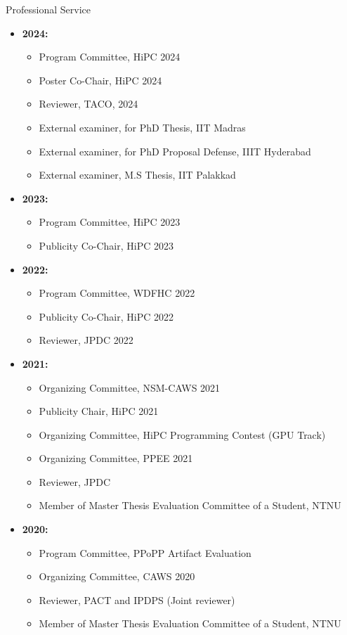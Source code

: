 \documentclass{resume} %
\begin{document}
\begin{rSection}{Professional Service}
\begin{itemize}
	\item \textbf{2024:}
	\begin{itemize}	
		\item Program Committee, HiPC 2024
		\item Poster Co-Chair, HiPC 2024
		\item Reviewer, TACO, 2024
		\item External examiner, for PhD Thesis, IIT Madras
		\item External examiner, for PhD Proposal Defense, IIIT Hyderabad
		\item External examiner, M.S Thesis, IIT Palakkad
	\end{itemize}
	\item \textbf{2023:}
	\begin{itemize}	
		\item Program Committee, HiPC 2023	
		\item Publicity Co-Chair, HiPC 2023
	\end{itemize}
	\item \textbf{2022:}
	\begin{itemize}	
		\item Program Committee, WDFHC 2022	
		\item Publicity Co-Chair, HiPC 2022
		\item Reviewer, JPDC 2022
	\end{itemize}
	\item \textbf{2021:}
	\begin{itemize}
		\item Organizing Committee, NSM-CAWS 2021		
		\item Publicity Chair, HiPC 2021
		\item Organizing Committee, HiPC Programming Contest (GPU Track)
		\item Organizing Committee, PPEE 2021
		\item Reviewer, JPDC
		\item Member of Master Thesis Evaluation Committee of a Student, NTNU
	\end{itemize}
	\item \textbf{2020:}
	\begin{itemize}
		\item Program Committee, PPoPP Artifact Evaluation
		\item Organizing Committee, CAWS 2020
		\item Reviewer, PACT and IPDPS (Joint reviewer)
		\item Member of Master Thesis Evaluation Committee of a Student, NTNU

\end{itemize}
\end{itemize}
\end{rSection}
\end{document}
